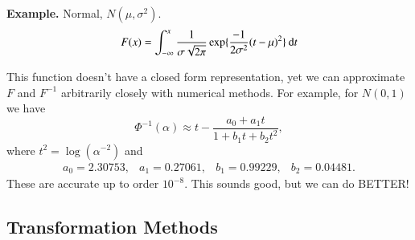 \documentclass[captions=tableheading]{scrbook}
\begin{document}
\begin{itemize}
\textbf{Example.} Normal, \( N(\mu,\sigma^{2}) \). 
\[
F(x)=\int_{-\infty}^{x}\frac{1}{\sigma\sqrt{2\pi}}\exp\{\frac{-1}{2\sigma^{2}}(t-\mu)^{2}\}\:\mathrm{d} t
\]

This function doesn't have a closed form representation, yet we can approximate $F$ and $F^{-1}$ arbitrarily closely with numerical methods. For example, for $N(0,1)$ we have 
\[
\Phi^{-1}(\alpha)\approx t-\frac{a_{0}+a_{1}t}{1+b_{1}t+b_{2}t^{2}},
\]
where $t^{2}=\log(\alpha^{-2})$ and 
\[
\begin{array}{cccc}
a_{0}=2.30753, & a_{1}=0.27061, & b_{1}=0.99229, & b_{2}=0.04481.
\end{array}
\]
 These are accurate up to order \(10^{-8}\). This sounds good, but we can do BETTER!

\end{itemize} %
\subsection{Transformation Methods}
\label{sec-2_3_2}
\end{document}
